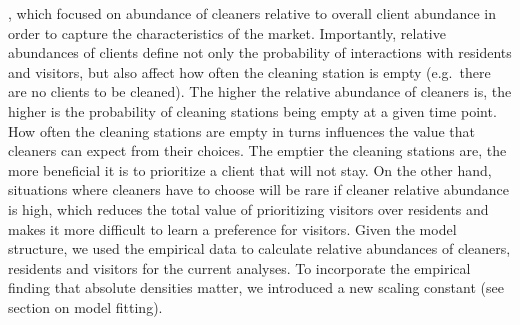 \documentclass[]{rsos}%
\begin{document}
\citep{quinones_Reinforcement_2019}, which focused on abundance of cleaners relative
to overall client abundance in order to capture the characteristics
of the market. Importantly, relative abundances of clients define not only
the probability of interactions with residents and visitors, but also affect
how often the cleaning station is empty (e.g.~there are no clients to be cleaned).
The higher the relative abundance of cleaners is, the higher is the probability
of cleaning stations being empty at a given time point. How often the
cleaning stations are empty in turns influences the value that cleaners can
expect from their choices. The emptier the cleaning stations are, the more
beneficial it is to prioritize a client that will not stay. On the other hand,
situations where cleaners have to choose will be rare if cleaner relative
abundance is high, which reduces the total value of prioritizing visitors
over residents and makes it more difficult to learn a preference for visitors.
Given the model structure, we used the empirical data to calculate relative
abundances of cleaners, residents and visitors for the current analyses.
To incorporate the empirical finding that absolute densities matter, we
introduced a new scaling constant (see section on model fitting).
\end{document}
